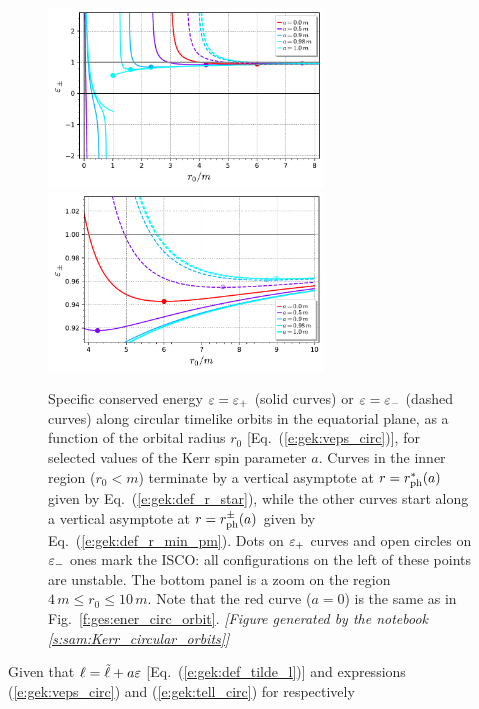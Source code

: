 \begin{figure}
\begin{center}
\includegraphics[width=0.65\textwidth]{gek_eps_circ_orb.pdf}\\
\includegraphics[width=0.65\textwidth]{gek_eps_circ_orb_zoom.pdf}
\end{center}
\caption[]{\label{f:gek:eps_circ_orb} \footnotesize
Specific conserved energy $\varepsilon=\varepsilon_+$ (solid curves) or $\varepsilon=\varepsilon_-$
(dashed curves) along circular timelike
orbits in the equatorial plane, as a function of the orbital radius $r_0$
[Eq.~(\ref{e:gek:veps_circ})], for selected values of the Kerr spin parameter $a$.
Curves in the inner region ($r_0 < m$) terminate by a vertical asymptote at $r = r_{\rm ph}^*(a)$ given
by Eq.~(\ref{e:gek:def_r_star}), while the other curves start along a
vertical asymptote at $r = r_{\rm ph}^\pm(a)$ given by Eq.~(\ref{e:gek:def_r_min_pm}).
Dots on $\varepsilon_+$ curves and open circles on $\varepsilon_-$ ones mark the ISCO: all
configurations on the left of these points are unstable.
The bottom panel is a zoom on the region $4\,m \leq r_0 \leq 10\,m$.
Note that the red curve ($a=0$) is the same as in Fig.~\ref{f:ges:ener_circ_orbit}.
\textsl{[Figure generated by the notebook \ref{s:sam:Kerr_circular_orbits}]}
}
\end{figure}
Given that $\ell = \tilde{\ell} + a \varepsilon$ [Eq.~(\ref{e:gek:def_tilde_l})]
and expressions (\ref{e:gek:veps_circ}) and (\ref{e:gek:tell_circ}) for respectively
